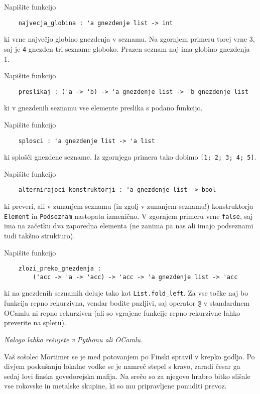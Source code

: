 \documentclass[arhiv]{../izpit}
\begin{document}
\podnaloga
Napišite funkcijo
\begin{verbatim}
    najvecja_globina : 'a gnezdenje list -> int
\end{verbatim}
ki vrne največjo globino gnezdenja v seznamu. Na zgornjem primeru torej vrne 3, saj je \verb|4| gnezden tri sezname globoko. Prazen seznam naj ima globino gnezdenja 1.

\podnaloga
Napišite funkcijo
\begin{verbatim}
    preslikaj : ('a -> 'b) -> 'a gnezdenje list -> 'b gnezdenje list
\end{verbatim}
ki v gnezdenih seznamu vse elemente preslika s podano funkcijo.

\podnaloga
Napišite funkcijo
\begin{verbatim}
    splosci : 'a gnezdenje list -> 'a list
\end{verbatim}
ki splošči gnezdene sezname. Iz zgornjega primera tako dobimo \verb|[1; 2; 3; 4; 5]|.

\podnaloga
Napišite funkcijo
\begin{verbatim}
    alternirajoci_konstruktorji : 'a gnezdenje list -> bool
\end{verbatim}
ki preveri, ali v zunanjem seznamu (in zgolj v zunanjem seznamu!) konstruktorja \verb|Element| in \verb|Podseznam| nastopata izmenično. V zgornjem primeru vrne \verb|false|, saj ima na začetku dva zaporedna elementa (ne zanima pa nas ali imajo podseznami tudi takšno strukturo).

\podnaloga
Napišite funkcijo
\begin{verbatim}
    zlozi_preko_gnezdenja :
        ('acc -> 'a -> 'acc) -> 'acc -> 'a gnezdenje list -> 'acc
\end{verbatim}
ki na gnezdenih seznamih deluje tako kot \verb|List.fold_left|. Za vse točke naj bo funkcija repno rekurzivna, vendar bodite pazljivi, saj operator \verb|@| v standardnem OCamlu ni repno rekurziven (ali so vgrajene funkcije repno rekurzivne lahko preverite na spletu).

\prostor

\naloga[]
\emph{Nalogo lahko rešujete v Pythonu ali OCamlu.}

Vaš sošolec Mortimer se je med potovanjem po Finski spravil v krepko godljo. Po divjem poskušanju lokalne vodke se je namreč stepel s kravo, zaradi česar ga sedaj lovi finska govedorejska mafija. Na srečo so za njegovo hrabro bitko slišale vse rokovske in metalske skupine, ki so mu pripravljene ponuditi prevoz.
\end{document}
